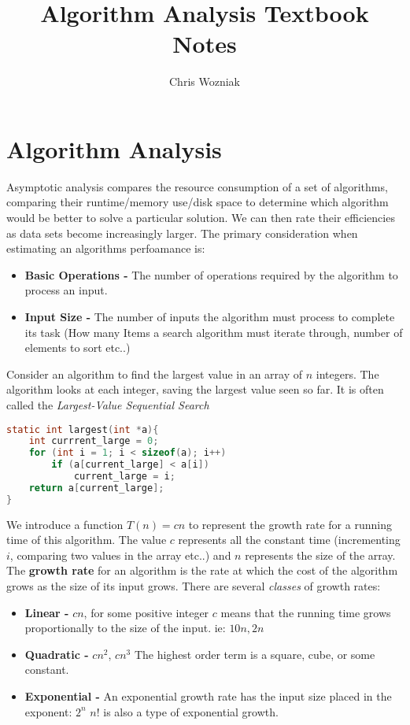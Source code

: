\documentclass{report}
\title{Algorithm Analysis Textbook Notes}
\author{Chris Wozniak}
\theoremstyle{definition}
\begin{document}
\maketitle
\tableofcontents
\chapter{Algorithm Analysis}
	Asymptotic analysis compares the resource consumption of a set of algorithms, comparing their runtime/memory use/disk space
	to determine which algorithm would be better to solve a particular solution. We can then rate their efficiencies as data sets become
	increasingly larger. The primary consideration when estimating an algorithms perfoamance is:
	\begin{itemize}
		\item \textbf{Basic Operations - } The number of operations required by the algorithm to process an input.
		\item \textbf{Input Size - } The number of inputs the algorithm must process to complete its task (How many
				Items a search algorithm must iterate through, number of elements to sort etc..)
	\end{itemize}
	Consider an algorithm to find the largest value in an array of $n$ integers. The algorithm looks at each integer, saving
	the largest value seen so far. It is often called the \textit{Largest-Value Sequential Search}
\begin{lstlisting}[language=c]
static int largest(int *a){
	int currrent_large = 0;
	for (int i = 1; i < sizeof(a); i++)
		if (a[current_large] < a[i])
			current_large = i;
	return a[current_large];
}
\end{lstlisting}
	We introduce a function $T(n) = cn$ to represent the growth rate for a running time of this algorithm. The value $c$ 
	represents all the constant time (incrementing $i$, comparing two values in the array etc..) and $n$ represents the 
	size of the array.
\newpage
	The \textbf{growth rate} for an algorithm is the rate at which the cost of the algorithm grows as the size of its input grows.
	There are several \textit{classes} of growth rates:
	\begin{itemize}
		\item \textbf{Linear - } $cn$, for some positive integer $c$ means that the running time grows proportionally to the 
			size of the input. ie: $10n, 2n$
		\item \textbf{Quadratic - } $cn^2$, $cn^3$ The highest order term is a square, cube, or some constant.
		\item \textbf{Exponential - } An exponential growth rate has the input size placed in the exponent: $2^n$ $n!$ is
			also a type of exponential growth.
	\end{itemize}
\end{document}

